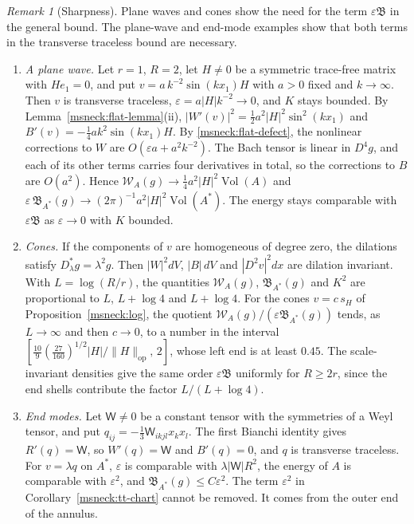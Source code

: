 \documentclass[11pt]{article}
\numberwithin{equation}{section}
\theoremstyle{definition}
\theoremstyle{remark}
\newtheorem{remark}[theorem]{Remark}
\DeclareMathOperator{\Vol}{Vol}
\begin{document}
\begin{remark}[Sharpness]\label{msneck:sharpness}
Plane waves and cones show the need for the term
\(\varepsilon\mathfrak B\) in the general bound. The plane-wave and
end-mode examples show that both terms in the transverse traceless
bound are necessary.
\begin{enumerate}[label=(\alph*)]
\item \emph{A plane wave.} Let \(r=1\), \(R=2\), let \(H\ne0\) be a
symmetric trace-free matrix with \(He_1=0\), and put
\(v=a\,k^{-2}\sin(kx_1)H\) with \(a>0\) fixed and \(k\to\infty\). Then
\(v\) is transverse traceless, \(\varepsilon=a|H|k^{-2}\to0\), and \(K\)
stays bounded. By Lemma~\ref{msneck:flat-lemma}(ii),
\(|W'(v)|^2=\tfrac12a^2|H|^2\sin^2(kx_1)\) and
\(B'(v)=-\tfrac14ak^2\sin(kx_1)H\). By \eqref{msneck:flat-defect}, the
nonlinear corrections to \(W\) are \(O(\varepsilon a+a^2k^{-2})\). The
Bach tensor is linear in \(D^4g\), and each of its other terms carries
four derivatives in total, so the corrections to \(B\) are \(O(a^2)\).
Hence \(\mathcal W_A(g)\to\tfrac14a^2|H|^2\Vol(A)\) and
\(\varepsilon\,\mathfrak B_{A^*}(g)\to(2\pi)^{-1}a^2|H|^2\Vol(A^*)\). The
energy stays comparable with \(\varepsilon\mathfrak B\) as
\(\varepsilon\to0\) with \(K\) bounded.
\item \emph{Cones.} If the components of \(v\) are homogeneous of degree
zero, the dilations satisfy \(D_\lambda^*g=\lambda^2g\). Then \(|W|^2dV\),
\(|B|\,dV\) and \(|D^2v|^2dx\) are dilation invariant. With
\(L=\log(R/r)\), the quantities \(\mathcal W_A(g)\), \(\mathfrak B_{A^*}(g)\)
and \(K^2\) are proportional to \(L\), \(L+\log4\) and \(L+\log4\). For the
cones \(v=c\,s_H\) of Proposition~\ref{msneck:log}, the quotient
\(\mathcal W_A(g)/(\varepsilon\mathfrak B_{A^*}(g))\) tends, as \(L\to\infty\)
and then \(c\to0\), to a number in the interval
\([\tfrac{10}9(\tfrac{27}{160})^{1/2}|H|/\|H\|_{\mathrm{op}},\,2]\), whose
left end is at least \(0.45\). The scale-invariant densities give the
same order \(\varepsilon\mathfrak B\) uniformly for \(R\ge2r\), since
the end shells contribute the factor \(L/(L+\log4)\).
\item \emph{End modes.} Let \(\mathsf W\ne0\) be a constant tensor with the
symmetries of a Weyl tensor, and put
\(q_{ij}=-\tfrac13\mathsf W_{ikjl}x_kx_l\). The first Bianchi identity
gives \(R'(q)=\mathsf W\), so \(W'(q)=\mathsf W\) and \(B'(q)=0\), and \(q\)
is transverse traceless. For \(v=\lambda q\) on \(A^*\), \(\varepsilon\) is
comparable with \(\lambda|\mathsf W|R^2\), the energy of \(A\) is comparable
with \(\varepsilon^2\), and \(\mathfrak B_{A^*}(g)\le C\varepsilon^2\). The
term \(\varepsilon^2\) in Corollary~\ref{msneck:tt-chart} cannot be
removed. It comes from the outer end of the annulus.
\end{enumerate}
\end{remark}
\end{document}
